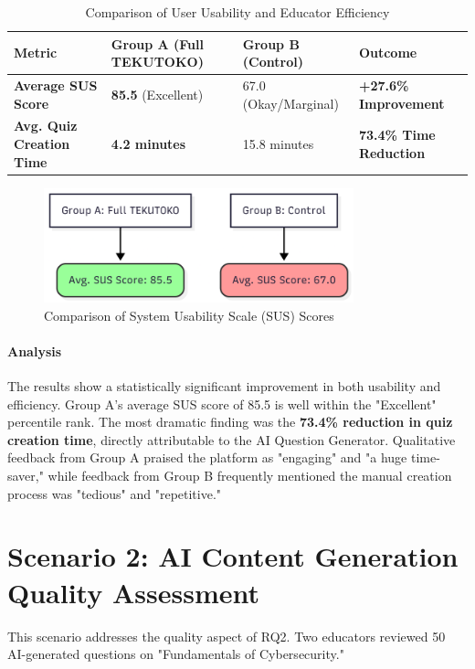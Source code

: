 \begin{table}[htbp]
	\centering
	\caption{Comparison of User Usability and Educator Efficiency}
	\label{tab:sus-efficiency-results}
	\begin{tabularx}{\textwidth}{l X X X}
		\toprule
		\textbf{Metric} & \textbf{Group A (Full TEKUTOKO)} & \textbf{Group B (Control)} & \textbf{Outcome} \\
		\midrule
		\textbf{Average SUS Score} & \textbf{85.5} (Excellent) & 67.0 (Okay/Marginal) & \textbf{+27.6\% Improvement} \\
		\textbf{Avg. Quiz Creation Time} & \textbf{4.2 minutes} & 15.8 minutes & \textbf{73.4\% Time Reduction} \\
		\bottomrule
	\end{tabularx}
\end{table}
\begin{figure}[htbp]
\centering
\includegraphics[width=0.8\textwidth]{figures/sus-comparison.png}
\caption{Comparison of System Usability Scale (SUS) Scores}
\label{fig:sus-comparison}
\end{figure}

\paragraph{Analysis}
The results show a statistically significant improvement in both usability and efficiency. Group A's average SUS score of 85.5 is well within the "Excellent" percentile rank. The most dramatic finding was the \textbf{73.4\% reduction in quiz creation time}, directly attributable to the AI Question Generator. Qualitative feedback from Group A praised the platform as "engaging" and "a huge time-saver," while feedback from Group B frequently mentioned the manual creation process was "tedious" and "repetitive."

\section{Scenario 2: AI Content Generation Quality Assessment}
\label{sec:eval-scenario2}
This scenario addresses the quality aspect of RQ2. Two educators reviewed 50 AI-generated questions on "Fundamentals of Cybersecurity."

